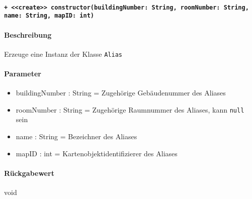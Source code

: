 \paragraph{\texttt{+ <<create>> constructor(buildingNumber: String, roomNumber: String, name: String, mapID: int)}}\label{AP_Alias_constructor}%
\paragraph*{Beschreibung}
Erzeuge eine Instanz der Klasse \verb#Alias#
\paragraph*{Parameter}
\begin{itemize}
    \item buildingNumber : String = Zugehörige Gebäudenummer des Aliases
    \item roomNumber : String = Zugehörige Raumnummer des Aliases, kann \verb#null# sein
    \item name : String = Bezeichner des Aliases
    \item mapID : int = Kartenobjektidentifizierer des Aliases
\end{itemize}
\paragraph*{Rückgabewert}
void